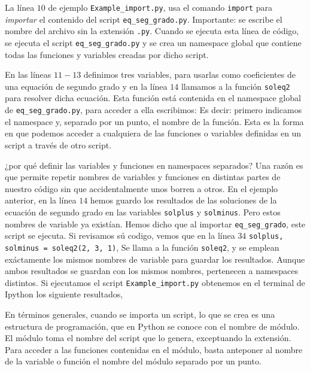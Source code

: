 \begin{paracol}{2}
La línea $10$ de ejemplo \texttt{Example_import.py}, usa el comando \texttt{import} para \emph{importar} el contenido del script \texttt{eq_seg_grado.py}. Importante: se escribe el nombre del archivo sin la extensión \texttt{.py}. Cuando se ejecuta esta línea de código, se ejecuta el script \texttt{eq_seg_grado.py} y se crea un namespace global que contiene todas las funciones y variables creadas por dicho script.

En las líneas $11-13$ definimos tres variables, para usarlas como coeficientes de una equación de segundo grado y en la línea $14$ llamamos a la función \texttt{soleq2} para resolver dicha ecuación. Esta función está contenida en el namespace global de \texttt{eq_seg_grado.py}, para acceder a ella escribimos:
Es decir: primero indicamos el namespace y, separado por un punto, el nombre de la función. Esta es la forma en que podemos acceder a cualquiera de las funciones o variables definidas en un script a través de otro script.

¿por qué definir las variables y funciones en namespaces separados? Una razón es que permite repetir nombres de variables y funciones en distintas partes de nuestro código sin que accidentalmente unos borren a otros. En el ejemplo anterior, en la línea $14$ hemos guardo los resultados de las soluciones de la ecuación de segundo grado en las variables \texttt{solplus} y \texttt{solminus}. Pero estos nombres de variable ya existían. Hemos dicho que al importar \texttt{eq_seg_grado}, este script se ejecuta. Si revisamos sú codigo, vemos que en la línea $34$ \texttt{solplus, solminus = soleq2(2, 3, 1)}, Se llama a la función \texttt{soleq2}, y se emplean exáctamente los mismos nombres de variable para guardar los resultados. Aunque ambos resultados se guardan con los mismos nombres, pertenecen a namespaces distintos. Si ejecutamos el script \texttt{Example_import.py} obtenemos en el terminal de Ipython los siguiente resultados,

En términos generales, cuando se importa un script, lo que se crea es una estructura de programación, que en Python se conoce con el nombre de módulo. El módulo toma el nombre del script que lo genera, exceptuando la extensión. Para acceder a las funciones contenidas en el módulo, basta anteponer al nombre de la variable o función el nombre del módulo separado por un punto.


\end{paracol}

